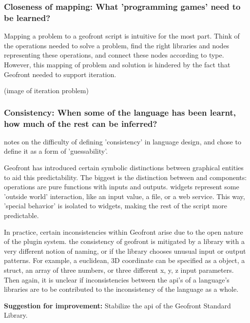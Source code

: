 
\subsubsection*{Closeness of mapping: What 'programming games' need to be learned?}

Mapping a problem to a geofront script is intuitive for the most part.
Think of the operations needed to solve a problem, 
find the right libraries and nodes representing these operations,
and connect these nodes according to type. 
However, this mapping of problem and solution is hindered by the fact that Geofront needed to support iteration. 

(image of iteration problem)



\subsubsection*{Consistency: When some of the language has been learnt, how much of the rest can be inferred?}

\cite[]{green_usability_1996} notes on the difficulty of defining 'consistency' in language design, and chose to define it as a form of 'guessability'.

Geofront has introduced certain symbolic distinctions between graphical entities to aid this predictability. 
The biggest is the distinction between  and  components: 
operations are pure functions with inputs and outputs. 
widgets represent some 'outside world' interaction, like an input value, a file, or a web service. 
This way, 'special behavior' is isolated to widgets, making the rest of the script more predictable. 

In practice, certain inconsistencies within Geofront arise due to the open nature of the plugin system. 
the consistency of geofront is mitigated by a library with a very different notion of naming, or if the library chooses unusual input or output patterns. 
For example, a euclidean, 3D coordinate can be specified as a  object, a struct, an array of three numbers, or three different x, y, z input parameters.
Then again, it is unclear if inconsistencies between the api's of a language's libraries are to be contributed to the inconsistency of the language as a whole. 

\textbf{Suggestion for improvement:} Stabilize the api of the Geofront Standard Library.




